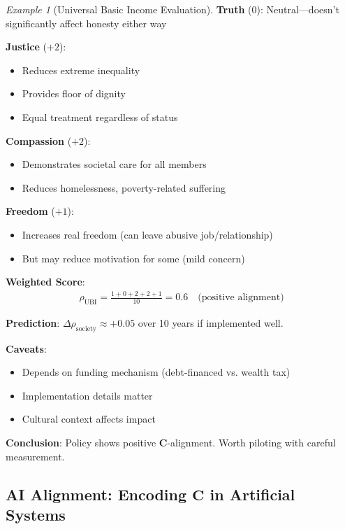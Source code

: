 \documentclass[11pt,a4paper]{article}
\theoremstyle{definition}
\theoremstyle{remark}
\newtheorem{example}{Example}[section]
\begin{document}
\begin{small}
\begin{enumerate}
\begin{example}[Universal Basic Income Evaluation]
\textbf{Truth} (\(0\)): Neutral—doesn't significantly affect honesty either way

\textbf{Justice} (\(+2\)): 
\begin{itemize}
    \item Reduces extreme inequality
    \item Provides floor of dignity
    \item Equal treatment regardless of status
\end{itemize}

\textbf{Compassion} (\(+2\)):
\begin{itemize}
    \item Demonstrates societal care for all members
    \item Reduces homelessness, poverty-related suffering
\end{itemize}

\textbf{Freedom} (\(+1\)):
\begin{itemize}
    \item Increases real freedom (can leave abusive job/relationship)
    \item But may reduce motivation for some (mild concern)
\end{itemize}

\textbf{Weighted Score}:
\begin{align}
\rho_{\text{UBI}} = \frac{1 + 0 + 2 + 2 + 1}{10} = 0.6 \quad \text{(positive alignment)}
\end{align}

\textbf{Prediction}: \(\Delta \rho_{\text{society}} \approx +0.05\) over 10 years if implemented well.

\textbf{Caveats}:
\begin{itemize}
    \item Depends on funding mechanism (debt-financed vs. wealth tax)
    \item Implementation details matter
    \item Cultural context affects impact
\end{itemize}

\textbf{Conclusion}: Policy shows positive \(\mathbf{C}\)-alignment. Worth piloting with careful measurement.
\end{example}

\subsection{AI Alignment: Encoding \(\mathbf{C}\) in Artificial Systems}


\end{enumerate}
\end{small}
\end{document}
